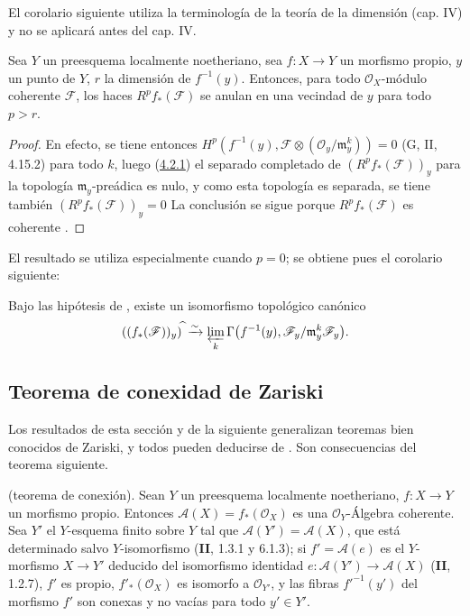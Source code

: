 El corolario siguiente utiliza la terminología de la teoría de la dimensión
(cap. IV) y no se aplicará antes del cap. IV.

\begin{corollary}[4.2.2]
\label{III.4.2.2}
\label{III.4.2.2-fr}
Sea $Y$ un preesquema localmente noetheriano, sea $f:X\to Y$ un morfismo
propio, $y$ un punto de $Y$, $r$ la dimensión de
$f^{-1}(y)$.
Entonces, para todo $\mathcal O_X$-módulo coherente $\mathcal F$, los haces
$R^pf_*(\mathcal F)$ se anulan en una vecindad de $y$ para todo
$p>r$.
\end{corollary}

\begin{proof}
En efecto, se tiene entonces
$H^p(f^{-1}(y),
\mathcal F\otimes(\mathcal O_y/\mathfrak m_y^k))=0$
(G, II, 4.15.2) para todo $k$, luego
(\hyperref[III.4.2.1-fr]{4.2.1}) el separado completado de
$(R^pf_*(\mathcal F))_y$ para la topología
$\mathfrak m_y$-preádica es nulo, y como esta topología es separada, se tiene también $(R^pf_*(\mathcal F))_y=0$
La conclusión se sigue porque $R^pf_*(\mathcal F)$ es coherente
.
\end{proof}

\begin{env}[4.2.3]
\label{III.4.2.3}
\label{III.4.2.3-fr}
El resultado  se utiliza especialmente cuando $p=0$; se obtiene pues el corolario siguiente:
\end{env}

\begin{corollary}[4.2.4]
\label{III.4.2.4}
\label{III.4.2.4-fr}
Bajo las hipótesis de \textup{}, existe un isomorfismo
topológico canónico
\[
((f_*(\mathcal F))_y)^{\widehat{\,}}
\xrightarrow{\sim}
\varprojlim_k\Gamma\bigl(f^{-1}(y),
\mathcal F_y/\mathfrak m_y^k\mathcal F_y\bigr).
\]
\end{corollary}


\subsection{Teorema de conexidad de Zariski}
\label{subsection:III.4.3}
\label{subsection:III.4.3-fr}
\label{III.4.3}
\label{III.4.3-fr}

Los resultados de esta sección y de la siguiente generalizan teoremas
bien conocidos de Zariski, y todos pueden deducirse de
. Son consecuencias del teorema siguiente.

\begin{theorem}[4.3.1]
\label{III.4.3.1-fr}
\textnormal{(teorema de conexión).}
Sean $Y$ un preesquema localmente noetheriano, $f:X\to Y$ un morfismo
propio. Entonces $\mathcal A(X)=f_*(\mathcal O_X)$ es una
$\mathcal O_Y$-Álgebra coherente.
Sea $Y'$ el $Y$-esquema finito sobre $Y$ tal que
$\mathcal A(Y')=\mathcal A(X)$, que está determinado salvo $Y$-isomorfismo
\textup{(\textbf{II}, 1.3.1 y 6.1.3)}; si $f'=\mathcal A(e)$ es el $Y$-morfismo
$X\to Y'$ deducido del isomorfismo identidad
$e:\mathcal A(Y')\to\mathcal A(X)$ \textup{(\textbf{II}, 1.2.7)}, $f'$ es propio,
$f'_*(\mathcal O_X)$ es isomorfo a $\mathcal O_{Y'}$, y las fibras
$f'^{-1}(y')$ del morfismo $f'$ son conexas y no vacías para todo
$y'\in Y'$.
\end{theorem}

